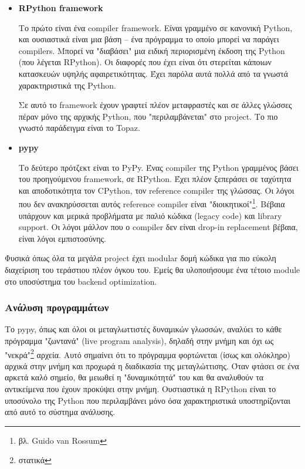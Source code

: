 \begin{itemize}

\item \textbf{RPython framework}

Το πρώτο είναι ένα compiler framework. Είναι γραμμένο σε κανονική Python, και
ουσιαστικά είναι μια βάση – ένα πρόγραμμα το οποίο μπορεί να παράγει compilers.
Μπορεί να "διαβάσει" μια ειδική περιορισμένη έκδοση της Python (που λέγεται
RPython). Οι διαφορές που έχει είναι ότι στερείται κάποιων κατασκευών υψηλής
αφαιρετικότητας. Έχει παρόλα αυτά πολλά από τα γνωστά χαρακτηριστικά της Python.

Σε αυτό το framework έχουν γραφτεί πλέον μεταφραστές και σε άλλες γλώσσες πέραν
μόνο της αρχικής Python, που "περιλαμβάνεται" στο project. Το πιο γνωστό
παράδειγμα είναι το Topaz\cite{topaz}.


\item \textbf{pypy}

Το δεύτερο πρότζεκτ είναι το PyPy. Ένας compiler της Python γραμμένος βάσει του
προηγούμενου framework, σε RPython. Έχει πλέον ξεπεράσει σε ταχύτητα και
αποδοτικότητα τον CPython, τον reference compiler της γλώσσας. Οι λόγοι που δεν
ανακηρύσσεται αυτός reference compiler είναι "διοικητικοί"\footnote{βλ. Guido
van Rossum}. Βέβαια υπάρχουν και μερικά προβλήματα με παλιό κώδικα (legacy code)
και library support. Οι λόγοι μάλλον που ο compiler δεν είναι drop-in
replacement βέβαια, είναι λόγοι εμπιστοσύνης.

\end{itemize}

Φυσικά όπως όλα τα μεγάλα project έχει modular δομή κώδικα για πιο εύκολη
διαχείριση του τεράστιου πλέον όγκου του. Εμείς θα υλοποιήσουμε ένα τέτοιο
module στο υποσύστημα του backend optimization.

\subsubsection{Ανάλυση προγραμμάτων}

Το pypy, όπως και όλοι οι μεταγλωττιστές δυναμικών γλωσσών, αναλύει το κάθε
πρόγραμμα "ζωντανά" (live program analysis), δηλαδή στην μνήμη και όχι ως
"νεκρά"\footnote{στατικά} αρχεία. Αυτό σημαίνει ότι το πρόγραμμα φορτώνεται
(ίσως και ολόκληρο) αρχικά στην μνήμη και προχωρά η διαδικασία της
μεταγλώττισης. Όταν φτάσει σε ένα αρκετά καλό σημείο, θα μειωθεί η
"δυναμικότητά" του και θα αναλυθούν τα αντικείμενα που έχουν προκύψει στην
μνήμη. Ουστιαστικά η RPython είναι το υποσύνολο της Python που περιλαμβάνει μόνο
όσα χαρακτηριστικά υποστηρίζονται από αυτό το σύστημα ανάλυσης.


